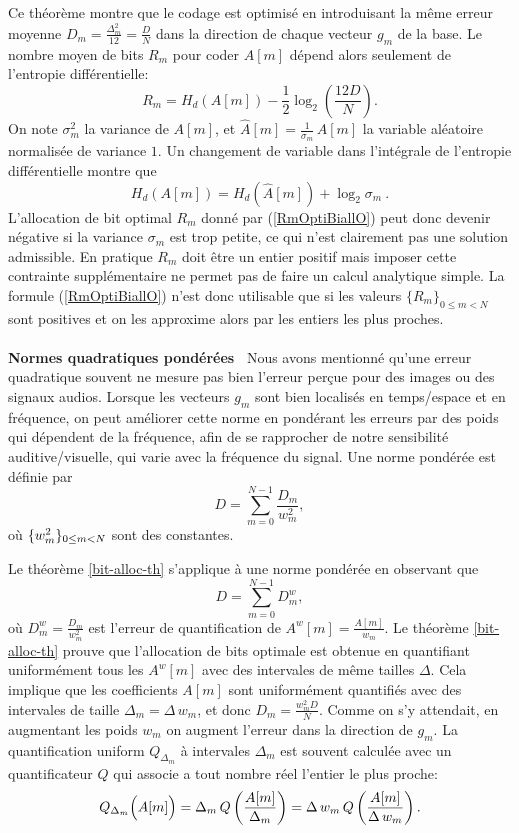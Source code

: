 Ce th\'eor\`eme montre que le codage est optimis\'e en
introduisant la m\^eme erreur moyenne
$D_m = \frac {\Delta_m^2} {12} = \frac D N$ dans la direction 
de chaque vecteur $g_m$ de la base. Le nombre moyen de bits
$R_m$ pour coder $A[m]$ d\'epend alors seulement 
de l'entropie diff\'erentielle: 
\begin{equation}
\label{RmOptiBiallO}
R_m = H_d (A[m]) -  \frac 1 2 \log_2 \left(\frac {12 D} N \right) .
\end{equation}
On note $\sigma_m^2$ la variance de $A[m]$, et 
$\hat A [m] = \frac 1 {\sigma_m} \, A[m]$ la variable al\'eatoire
normalis\'ee de variance $1$. Un changement de variable dans
l'int\'egrale de l'entropie diff\'erentielle montre que
\[
H_d (A[m]) = H_d (\hat A[m]) + \log_2 \sigma_m~.
\]
L'allocation de bit optimal $R_m$ donn\'e par 
(\ref{RmOptiBiallO}) peut donc devenir n\'egative si
la variance $\sigma_m$ est trop petite, ce qui n'est clairement
pas une solution admissible. 
En pratique $R_m$ doit \^etre un entier positif mais imposer cette
contrainte suppl\'ementaire ne permet pas de faire un
calcul analytique simple. La formule (\ref{RmOptiBiallO}) n'est donc
utilisable que si les valeurs $\{R_m\}_{0 \leq m < N}$ 
sont positives et on les
approxime alors par les entiers les plus proches.
\\
\\
{\bf Normes quadratiques pond\'er\'ees\ } 
Nous avons mentionn\'e qu'une erreur quadratique souvent ne
mesure pas bien l'erreur per\c{c}ue pour des images ou des
signaux audios. Lorsque les vecteurs
$g_m$ sont bien localis\'es en temps/espace et en fr\'equence,
on peut am\'eliorer cette norme 
en pond\'erant les erreurs par des poids qui d\'ependent
de la fr\'equence, afin de se rapprocher de notre sensibilit\'e
auditive/visuelle, qui varie avec la fr\'equence du signal.
Une norme pond\'er\'ee est d\'efinie par
\begin{equation}
\label{weight-normed}
D =  \sum_{m=0}^{N-1} \frac{D_m} {w_m^2} , 
\end{equation}
o\`u $\{ w_m^2\}_{ 0 \leq m < N}$ sont des constantes.

Le th\'eor\`eme \ref{bit-alloc-th} s'applique
\`a une norme pond\'er\'ee en observant que
\[
D =  \sum_{m=0}^{N-1} D^w_m, 
\]
o\`u $D^w_m =  \frac {D_m} {w_m^2}$
est l'erreur de quantification de $A^w [m] = \frac {A[m]} {w_m}$. 
Le th\'eor\`eme \ref{bit-alloc-th} 
prouve que l'allocation de bits optimale
est obtenue en quantifiant uniform\'ement
tous les $A^w [m]$ avec des intervales de m\^eme tailles $\Delta$.
Cela implique que les
coefficients $A[m]$ sont uniform\'ement quantifi\'es
avec des intervales de taille
$\Delta_m =  {\Delta}\, {w_m}$, et donc
$D_m = \frac {w_m^2 D}  {N}$.
Comme on s'y attendait, en augmentant les poids $w_m$ on
augment l'erreur dans la direction de $g_m$.
La quantification uniform
$Q_{\Delta_m}$ \`a intervales 
$\Delta_m$ est souvent calcul\'ee avec un quantificateur
$Q$ qui associe a tout nombre r\'eel l'entier le plus proche:
\begin{equation}
\label{variable-unifo-quan}
Q_{\Delta_m}\Bigl(A[m]\Bigr) = \Delta_m\, Q\left (\frac {A[m]} {\Delta_m}\right) =
{\Delta}\, {w_m}\, Q \left(\frac {A[m]} {\Delta\,w_m}\right) .
\end{equation}


